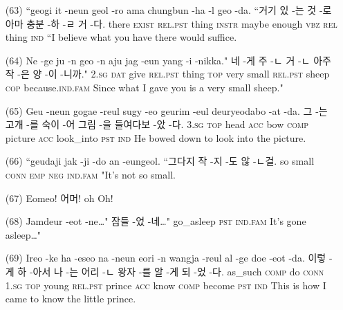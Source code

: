 \begin{itemize}
\item [(63)]
\tgl
		{``geogi it -neun geol -ro ama chungbun -ha -l geo -da.}
		{``거기 있 -는 것 -로 아마 충분 -하 -ㄹ 거 -다.}
		{there	\textsc{exist}	\textsc{rel.pst}	thing	\textsc{instr}	maybe	enough	\textsc{vbz}	\textsc{rel}	thing		\textsc{ind}}
		{``I believe what you have there would suffice.}

\item [(64)]
\tgl
		{Ne -ge ju -n geo -n aju jag -eun yang -i -nikka."}
		{네 -게 주 -ㄴ 거 -ㄴ 아주 작 -은 양 -이 -니까."}
		{\textsc{2.sg}	\textsc{dat}	give	\textsc{rel.pst}	thing	\textsc{top}	very	small	\textsc{rel.pst}	sheep	\textsc{cop}	because.\textsc{ind.fam}}
		{Since what I gave you is a very small sheep."}

\item [(65)]
\tgl
		{Geu -neun gogae -reul sugy -eo geurim -eul deuryeodabo -at -da.}
		{그 -는 고개 -를 숙이 -어 그림 -을 들여다보 -았 -다.}
		{\textsc{3.sg}	\textsc{top}	head	\textsc{acc}	bow	\textsc{comp}	picture	\textsc{acc}	look\_into	\textsc{pst}	\textsc{ind}}
		{He bowed down to look into the picture.}
		
\item [(66)]
\tgl
		{``geudaji jak -ji -do an -eungeol.}
		{``그다지 작 -지 -도 않 -ㄴ걸.}
		{so	small	\textsc{conn}	\textsc{emp}	\textsc{neg}	\textsc{ind.fam}}
		{"It's not so small.}

\item [(67)]
\tgl
		{Eomeo!}
		{어머!}
		{oh}
		{Oh!}

\item [(68)]
\tgl
		{Jamdeur -eot -ne…"}
		{잠들 -었 -네…"}
		{go\_asleep	\textsc{pst}	\textsc{ind.fam}}
		{It's gone asleep…"}

\item [(69)]
\tgl
		{Ireo -ke ha -eseo na -neun eori -n wangja -reul al -ge doe -eot -da.}
		{이렇 -게 하 -아서 나 -는 어리 -ㄴ 왕자 -를 알 -게 되 -었 -다.}
		{as\_such	\textsc{comp}	do	\textsc{conn}	\textsc{1.sg}	\textsc{top}	young	\textsc{rel.pst}	prince	\textsc{acc}	know	\textsc{comp}	become	\textsc{pst}	\textsc{ind}}
		{This is how I came to know the little prince.}
\end{itemize}

\pagebreak